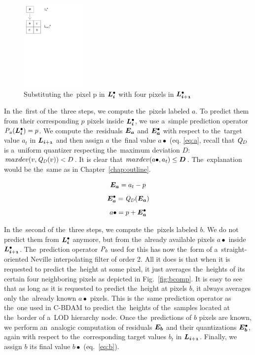 \begin{figure}
	\includegraphics[trim={0 19cm 11cm 0}, clip, width=0.28\textwidth]{figures/subst.pdf}\centering
	\caption{Substituting the~pixel p in $\ldot{i}$ with four pixels in $\ldot{i+1}$}
	\label{fig:subst}
\end{figure}
In the~first of the~three steps, we compute the~pixels labeled $a$. To predict them from their corresponding $p$ pixels inside $\ldot{i}$, we use a~simple prediction operator $\opnorm{P}{a}(\ldot{i}) = p$. We compute the~residuals $\objnorm{E}{a}$ and $\objdot{E}{a}$ with respect to the~target value $a_t$ in $\lnorm{i+1}$ and then assign $a$ the~final value $a\bullet$ (eq. \ref{eq:a}, recall that $\mathit{Q_{D}}$ is a~uniform quantizer respecting the~maximum deviation $D$: $maxdev(v, \mathit{Q_{D}}(v)) < D$. It is clear that  $maxdev(a\bullet, a_{t}) \leq \objnorm{D}{}$. The~explanation would be the~same as in Chapter~\ref{chap:outline}.

$$\objnorm{E}{a} = a_t - p$$
$$\objdot{E}{a} = \opnorm{Q}{D}(\objnorm{E}{a})$$
\begin{equation}
\label{eq:a}
a\bullet = p + \objdot{E}{a}
\end{equation}

In the~second of the~three steps, we compute the~pixels labeled $b$. We do not predict them from $\ldot{i}$ anymore, but from the~already available pixels $a\bullet$ inside $\ldot{i+1}$. The~prediction operator $\mathit{P_{b}}$ used for this has now the~form of a~straight-oriented Neville interpolating filter of order 2. All it does is that when it is requested to predict the~height at some pixel, it just averages the~heights of its certain four neighboring pixels as depicted in Fig.~\ref{fig:bcomp}. It is easy to see that as long as it is requested to predict the~height at pixels $b$, it always averages only the~already known $a\bullet$ pixels. This is the~same prediction operator as the~one used in C-BDAM to predict the~heights of the~samples located at the~border of a~LOD hierarchy node. Once the~predictions of $b$ pixels are known, we perform an~analogic computation of residuals $\objnorm{E}{b}$ and their quantizations $\objdot{E}{b}$, again with respect to the~corresponding target values $b_t$ in $\lnorm{i+1}$. Finally, we assign $b$ its final value $b\bullet$ (eq.~\ref{eq:b}).

